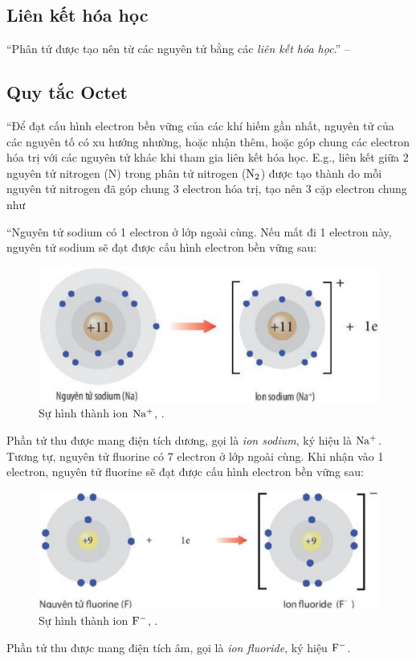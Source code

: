 \documentclass[oneside]{book}
\numberwithin{equation}{section}
\begin{document}
\subsection{Liên kết hóa học}
``Phân tử được tạo nên từ các nguyên tử bằng các \textit{liên kết hóa học}.'' -- \cite[p. 53]{SGK_Hoa_Hoc_10_Chan_Troi_Sang_Tao}

\subsection{Quy tắc Octet}
``Để đạt cấu hình electron bền vững của các khí hiếm gần nhất, nguyên tử của các nguyên tố có xu hướng nhường, hoặc nhận thêm, hoặc góp chung các electron hóa trị với các nguyên tử khác khi tham gia liên kết hóa học. E.g., liên kết giữa 2 nguyên tử nitrogen (N) trong phân tử nitrogen ($\rm N_2$) được tạo thành do mỗi nguyên tử nitrogen đã góp chung 3 electron hóa trị, tạo nên 3 cặp electron chung như \cite[Hình 8.2: \textsf{Sự hình thành liên kết trong phân tử nitrogen}, p. 53]{SGK_Hoa_Hoc_10_Chan_Troi_Sang_Tao}

``Nguyên tử sodium có 1 electron ở lớp ngoài cùng. Nếu mất đi 1 electron này, nguyên tử sodium sẽ đạt được cấu hình electron bền vững sau:

\begin{figure}[H]
	\centering
	\includegraphics[scale=0.15]{su_hinh_thanh_ion_Na}
	\caption{Sự hình thành ion $\rm Na^+$, \cite[Hình 8.3, p. 53]{SGK_Hoa_Hoc_10_Chan_Troi_Sang_Tao}.}
\end{figure}
Phần tử thu được mang điện tích dương, gọi là \textit{ion sodium}, ký hiệu là $\rm Na^+$. Tương tự, nguyên tử fluorine có 7 electron ở lớp ngoài cùng. Khi nhận vào 1 electron, nguyên tử fluorine sẽ đạt được cấu hình electron bền vững sau:

\begin{figure}[H]
	\centering
	\includegraphics[scale=0.15]{su_hinh_thanh_ion_F}
	\caption{Sự hình thành ion $\rm F^-$, \cite[Hình 8.3, p. 54]{SGK_Hoa_Hoc_10_Chan_Troi_Sang_Tao}.}
\end{figure}
Phần tử thu được mang điện tích âm, gọi là \textit{ion fluoride}, ký hiệu $\rm F^-$.
\end{document}
